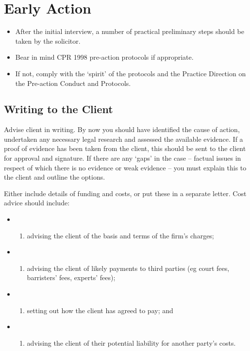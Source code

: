 \documentclass[
]{article}
\providecommand{\tightlist}{%
  \setlength{\itemsep}{0pt}\setlength{\parskip}{0pt}}
\begin{document}
\hypertarget{early-action}{%
\section{Early Action}\label{early-action}}

\begin{itemize}
\tightlist
\item
  After the initial interview, a number of practical preliminary steps
  should be taken by the solicitor.
\item
  Bear in mind CPR 1998 pre-action protocols if appropriate.
\item
  If not, comply with the `spirit' of the protocols and the Practice
  Direction on the Pre-action Conduct and Protocols.
\end{itemize}

\hypertarget{writing-to-the-client}{%
\subsection{Writing to the Client}\label{writing-to-the-client}}

Advise client in writing. By now you should have identified the cause of
action, undertaken any necessary legal research and assessed the
available evidence. If a proof of evidence has been taken from the
client, this should be sent to the client for approval and signature. If
there are any `gaps' in the case -- factual issues in respect of which
there is no evidence or weak evidence -- you must explain this to the
client and outline the options.

Either include details of funding and costs, or put these in a separate
letter. Cost advice should include:

\begin{itemize}
\item
  \begin{enumerate}
  \def\labelenumi{(\alph{enumi})}
  \tightlist
  \item
    advising the client of the basis and terms of the firm's charges;
  \end{enumerate}
\item
  \begin{enumerate}
  \def\labelenumi{(\alph{enumi})}
  \setcounter{enumi}{1}
  \tightlist
  \item
    advising the client of likely payments to third parties (eg court
    fees, barristers' fees, experts' fees);
  \end{enumerate}
\item
  \begin{enumerate}
  \def\labelenumi{(\alph{enumi})}
  \setcounter{enumi}{2}
  \tightlist
  \item
    setting out how the client has agreed to pay; and
  \end{enumerate}
\item
  \begin{enumerate}
  \def\labelenumi{(\alph{enumi})}
  \setcounter{enumi}{3}
  \tightlist
  \item
    advising the client of their potential liability for another party's
    costs.
  \end{enumerate}
\end{itemize}
\end{document}
